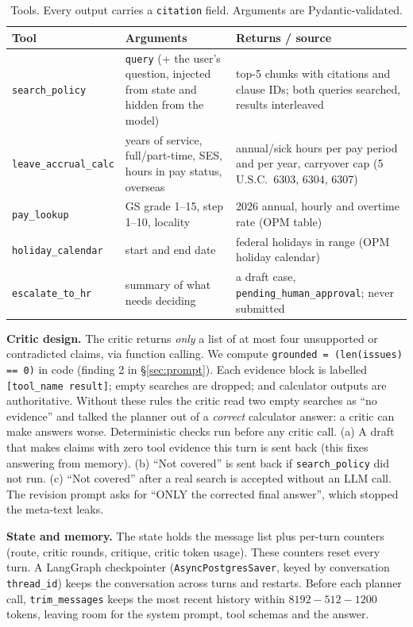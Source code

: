 \documentclass[11pt,a4paper]{article}
\begin{document}
\begin{table}[h]
\centering\small
\caption{Tools. Every output carries a \texttt{citation} field. Arguments are Pydantic-validated.}
\label{tab:tools}
\begin{tabularx}{\linewidth}{@{}lYY@{}}
\toprule
Tool & Arguments & Returns / source \\
\midrule
\texttt{search\_policy} & \texttt{query} (+ the user's question, injected from state and hidden from the model) &
top-5 chunks with citations and clause IDs; both queries searched, results interleaved \\
\texttt{leave\_accrual\_calc} & years of service, full/part-time, SES, hours in pay status, overseas &
annual/sick hours per pay period and per year, carryover cap (5 U.S.C.\ 6303, 6304, 6307) \\
\texttt{pay\_lookup} & GS grade 1--15, step 1--10, locality & 2026 annual, hourly and overtime rate (OPM table) \\
\texttt{holiday\_calendar} & start and end date & federal holidays in range (OPM holiday calendar) \\
\texttt{escalate\_to\_hr} & summary of what needs deciding & a draft case, \texttt{pending\_human\_approval}; never submitted \\
\bottomrule
\end{tabularx}
\end{table}

\textbf{Critic design.} The critic returns \emph{only} a list of at most four unsupported or contradicted claims,
via function calling. We compute \texttt{grounded = (len(issues) == 0)} in code (finding 2 in \S\ref{sec:prompt}).
Each evidence block is labelled \texttt{[tool\_name result]}; empty searches are dropped; and calculator outputs are
authoritative. Without these rules the critic read two empty searches as ``no evidence'' and talked the planner out
of a \emph{correct} calculator answer: a critic can make answers worse. Deterministic checks run before any critic
call. (a) A draft that makes claims with zero tool evidence this turn is sent back (this fixes answering from
memory). (b) ``Not covered'' is sent back if \texttt{search\_policy} did not run. (c) ``Not covered'' after a real
search is accepted without an LLM call. The revision prompt asks for ``ONLY the corrected final answer'', which
stopped the meta-text leaks.

\textbf{State and memory.} The state holds the message list plus per-turn counters (route, critic rounds,
critique, critic token usage). These counters reset every turn. A LangGraph checkpointer
(\texttt{AsyncPostgresSaver}, keyed by conversation \texttt{thread\_id}) keeps the conversation across turns and
restarts. Before each planner call, \texttt{trim\_messages} keeps the most recent history within
$8192 - 512 - 1200$ tokens, leaving room for the system prompt, tool schemas and the answer.
\end{document}
